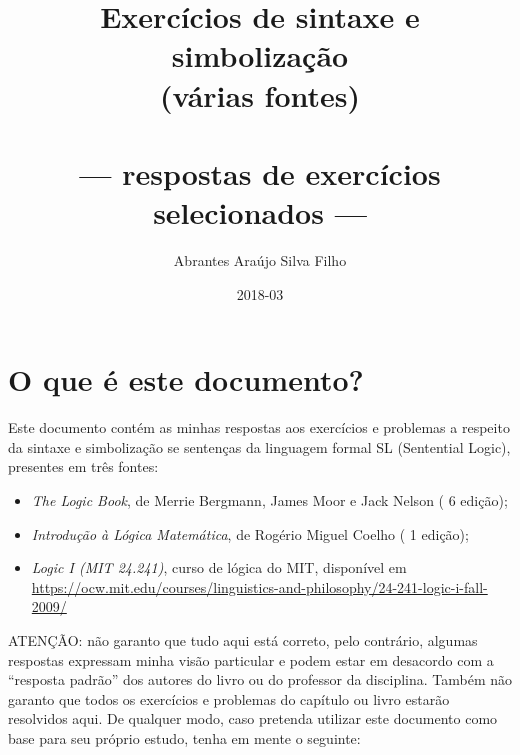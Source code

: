 \documentclass[pdftex,a4paper,12pt,brazil]{article} %
\newcommand{\ordinal}[2]{%
#1%
\ifthenelse{\equal{a}{#2}}%
{\textordfeminine}%
{\textordmasculine}}
\begin{document}
\title{Exercícios de sintaxe e simbolização\\
  (várias fontes)\\
  \ \\
--- respostas de exercícios selecionados ---}
\author{Abrantes Araújo Silva Filho}
\date{2018-03}
\maketitle
\tableofcontents


\section{O que é este documento?} 
\label{o_que_e}

Este documento contém as minhas respostas aos exercícios e problemas a respeito da sintaxe e
simbolização se sentenças da linguagem formal SL (Sentential Logic), presentes em três fontes:

\begin{itemize}
\item \emph{The Logic Book}, de Merrie Bergmann, James Moor e Jack Nelson (\ordinal{6}{a}
  edição);
\item \emph{Introdução à Lógica Matemática}, de Rogério Miguel Coelho (\ordinal{1}{a}
  edição);
\item \emph{Logic I (MIT 24.241)}, curso de lógica do MIT, disponível em
  \url{https://ocw.mit.edu/courses/linguistics-and-philosophy/24-241-logic-i-fall-2009/}
\end{itemize}

ATENÇÃO: não garanto que tudo aqui está correto, pelo contrário, algumas respostas expressam
minha visão particular e podem estar em desacordo com
a ``resposta padrão'' dos autores do livro ou do professor da disciplina. Também
não garanto que todos os exercícios e problemas do capítulo ou livro estarão resolvidos aqui.
De qualquer modo, caso pretenda
utilizar este documento como base para seu próprio estudo, tenha em mente o seguinte:
\end{document}
